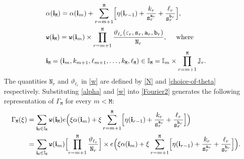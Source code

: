 \documentclass[12pt, twoside]{article}
\theoremstyle{definition}
\numberwithin{equation}{section}
\begin{document}
\begin{align}  
&\alpha(\mathbf i_{\mathtt M}) = \alpha(\mathbf i_m) + \sum_{r=m+1}^{\mathtt M} \Bigl[ \eta(\mathbf i_{r-1}) + \frac{k_r}{\mathtt s_r^{\mathtt a_r}} + \frac{\ell_r}{\mathtt s_r^{\mathtt b_r}} \Bigr], \label{alpha} \\
&\mathtt w(\mathbf i_{\mathtt M}) = \mathtt w(\mathbf i_m) \times  \prod_{r=m+1}^{\mathtt M} \frac{\vartheta_{\ell_r}(\varepsilon_r, \mathtt s_r, \mathtt a_r, \mathtt b_r)}{\mathtt N_r}, \quad \text{ where } \label{w} \\ 
&\mathbf i_{\mathtt M} = (\mathbf i_{m}, k_{m+1}, \ell_{m+1}, \ldots, k_{\mathtt M}, \ell_{\mathtt M}) \in \mathbb I_{\mathtt M} = \mathbb I_{m} \times \prod_{r=m+1}^{\mathtt M} \mathbb J_r. \label{index-product}
\end{align}  
The quantities $\mathtt N_r$ and $\vartheta_{\ell_r}$ in \eqref{w} are defined by \eqref{N} and \eqref{choice-of-theta} respectively. 
Substituting \eqref{alpha} and \eqref{w} into \eqref{Fourier2} generates the following representation of $\Gamma_{\mathtt M}$ for every $m < \mathtt M$: 
\begin{align}
\Gamma_{\mathtt M}(\xi) &= \sum_{\mathbf i_{\mathtt M} \in \mathbb I_{\mathtt M}} \mathtt w(\mathbf i_{\mathtt M})  e\Bigl(\xi \alpha(\mathbf i_{m}) + \xi  \sum_{r=m+1}^{\mathtt M}  \Bigl[ \eta(\mathbf i_{r-1}) + \frac{k_r}{\mathtt s_r^{\mathtt a_r}} + \frac{\ell_r}{\mathtt s_r^{\mathtt b_r}} \Bigr] \Bigr) \label{YM0} \\ 
&= \sum_{\mathbf i_{\mathtt M} \in \mathbb I_{\mathtt M}} \mathtt w(\mathbf i_{m}) \Bigl[ \prod_{r=m+1}^{\mathtt M} \frac{\vartheta_{\ell_r}}{\mathtt N_r}  \Bigr] \times e\Bigl(\xi \alpha(\mathbf i_{m}) + \xi  \sum_{r=m+1}^{\mathtt M}  \Bigl[ \eta(\mathbf i_{r-1}) + \frac{k_r}{\mathtt s_r^{\mathtt a_r}} + \frac{\ell_r}{\mathtt s_r^{\mathtt b_r}} \Bigr] \Bigr). \label{not-a-product} 
\end{align} 
\end{document}
